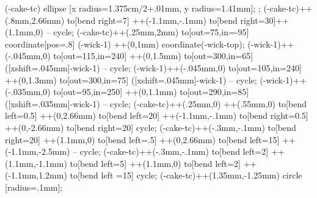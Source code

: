 {{      \fi\fi
  }
  \endscope
  \pingu@block{\pingu@color@cakehat@top} (\pingu@name-cake-tc) ellipse [x radius=1.375cm/2+.01mm, y radius=1.41mm];
  \pingu@draw[line width=\pingu@x@cakehat@outline@w,rounded corners=.075mm]{\pingu@color@cakehat@outline} \pingu@p@cake@outline;
  \pingu@block{\pingu@color@cakehat@candle@back} (\pingu@name-cake-tc)++(.8mm,2.66mm) to[bend right=7] ++(-1.1mm,-.1mm) to[bend right=30]++(1.1mm,0) -- cycle;
   (\pingu@name-cake-tc)++(.25mm,2mm) to[out=75,in=-95] coordinate[pos=.8] (\pingu@name-wick-1) ++(0,1mm) coordinate(\pingu@name-wick-top);
  \pingu@block{\pingu@color@cakehat@candle@fire} (\pingu@name-wick-1)++(-.045mm,0) to[out=115,in=240] ++(0,1.5mm) to[out=300,in=65] ([xshift=.045mm]\pingu@name-wick-1) -- cycle;
  \pingu@block{\pingu@color@cakehat@candle@fire@b} (\pingu@name-wick-1)++(-.045mm,0) to[out=105,in=240] ++(0,1.3mm) to[out=300,in=75] ([xshift=.045mm]\pingu@name-wick-1) -- cycle;
  \pingu@block{\pingu@color@cakehat@candle@fire@c} (\pingu@name-wick-1)++(-.035mm,0) to[out=95,in=250] ++(0,1.1mm) to[out=290,in=85] ([xshift=.035mm]\pingu@name-wick-1) -- cycle;
  \pingu@block{\pingu@color@cakehat@candle} (\pingu@name-cake-tc)++(.25mm,0) ++(.55mm,0) to[bend left=0.5] ++(0,2.66mm) to[bend left=20] ++(-1.1mm,-.1mm) to[bend right=0.5] ++(0,-2.66mm) to[bend right=20] cycle;
  \pingu@block[fill opacity=.125]{\pingu@color@cakehat@candle@shade} (\pingu@name-cake-tc)++(-.3mm,-.1mm) to[bend right=20] ++(1.1mm,0) to[bend left=.5] ++(0,2.66mm) to[bend left=15] ++(-1.1mm,-2.5mm) -- cycle;
  \pingu@block[fill opacity=.225]{\pingu@color@cakehat@candle@shade} (\pingu@name-cake-tc)++(-.3mm,-.1mm) to[bend left=2] ++(1.1mm,-1.1mm) to[bend left=5] ++(1.1mm,0) to[bend left=2] ++(-1.1mm,1.2mm) to[bend left =15] cycle;
  \pingu@block[fill opacity=.225]{\pingu@color@cakehat@candle@shade} (\pingu@name-cake-tc)++(1.35mm,-1.25mm) circle [radius=.1mm];
\endscope
}
